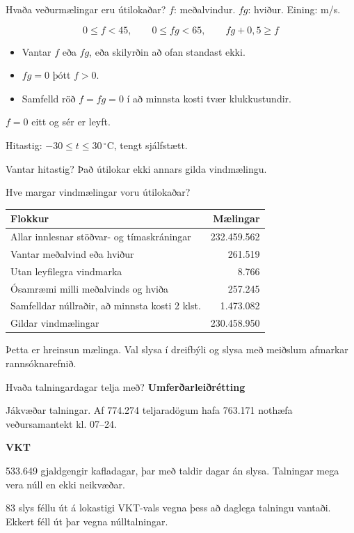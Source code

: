 \documentclass[aspectratio=169,12pt,t]{beamer}
\begin{document}
\begin{frame}{Hvaða veðurmælingar eru útilokaðar?}
\relax
\setlength{\parskip}{2pt}
$f$: meðalvindur. $fg$: hviður. Eining: m/s.\par
\[
0\leq f<45,\qquad 0\leq fg<65,\qquad fg+0{,}5\geq f
\]
\begin{itemize}\setlength{\itemsep}{3mm}
\item Vantar $f$ eða $fg$, eða skilyrðin að ofan standast ekki.
\item $fg=0$ þótt $f>0$.
\item Samfelld röð $f=fg=0$ í að minnsta kosti tvær klukkustundir.
\end{itemize}
\vspace{3mm}
$f=0$ eitt og sér er leyft.\par
Hitastig: $-30\leq t\leq30\,^{\circ}$C, tengt sjálfstætt.\par
Vantar hitastig? Það útilokar ekki annars gilda vindmælingu.
\end{frame}

\begin{frame}{Hve margar vindmælingar voru útilokaðar?}
\relax
\renewcommand{\arraystretch}{1.15}
\begin{tabular}{@{}lr@{}}\toprule
Flokkur & Mælingar\\\midrule
Allar innlesnar stöðvar- og tímaskráningar & 232.459.562\\
Vantar meðalvind eða hviður & 261.519\\
Utan leyfilegra vindmarka & 8.766\\
Ósamræmi milli meðalvinds og hviða & 257.245\\
Samfelldar núllraðir, að minnsta kosti 2 klst. & 1.473.082\\\midrule
Gildar vindmælingar & 230.458.950\\\bottomrule
\end{tabular}\par
\vspace{4mm}
Þetta er hreinsun mælinga. Val slysa í dreifbýli og slysa með meiðslum afmarkar rannsóknarefnið.
\end{frame}

\begin{frame}{Hvaða talningardagar telja með?}
\relax
\textbf{Umferðarleiðrétting}\par
Jákvæðar talningar. Af 774.274 teljaradögum hafa 763.171 nothæfa veðursamantekt kl. 07--24.\par
\vspace{5mm}
\textbf{VKT}\par
533.649 gjaldgengir kafladagar, þar með taldir dagar án slysa. Talningar mega vera núll en ekki neikvæðar.\par
\vspace{5mm}
83 slys féllu út á lokastigi VKT-vals vegna þess að daglega talningu vantaði. Ekkert féll út þar vegna núlltalningar.
\end{frame}
\end{document}
